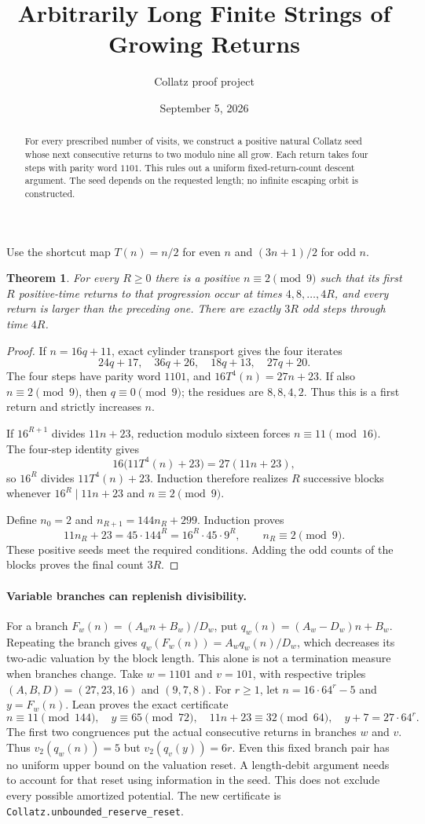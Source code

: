 \documentclass[10pt]{article}
\title{Arbitrarily Long Finite Strings of Growing Returns}
\author{Collatz proof project}
\date{September 5, 2026}
\newtheorem{theorem}{Theorem}
\begin{document}
\maketitle
\begin{abstract}
For every prescribed number of visits, we construct a positive natural
Collatz seed whose next consecutive returns to two modulo nine all grow.
Each return takes four steps with parity word $1101$. This rules out a
uniform fixed-return-count descent argument. The seed depends on the
requested length; no infinite escaping orbit is constructed.
\end{abstract}
Use the shortcut map $T(n)=n/2$ for even $n$ and $(3n+1)/2$ for odd $n$.
\begin{theorem}
For every $R\geq0$ there is a positive $n\equiv2\pmod9$ such that its
first $R$ positive-time returns to that progression occur at times
$4,8,\ldots,4R$, and every return is larger than the preceding one.
There are exactly $3R$ odd steps through time $4R$.
\end{theorem}
\begin{proof}
If $n=16q+11$, exact cylinder transport gives the four iterates
\[
24q+17,\quad36q+26,\quad18q+13,\quad27q+20.
\]
The four steps have parity word $1101$, and $16T^4(n)=27n+23$.
If also $n\equiv2\pmod9$, then $q\equiv0\pmod9$; the residues are
$8,8,4,2$. Thus this is a first return and strictly increases $n$.

If $16^{R+1}$ divides $11n+23$, reduction modulo sixteen forces
$n\equiv11\pmod{16}$. The four-step identity gives
\[
16\bigl(11T^4(n)+23\bigr)=27(11n+23),
\]
so $16^R$ divides $11T^4(n)+23$. Induction therefore realizes $R$
successive blocks whenever $16^R\mid11n+23$ and $n\equiv2\pmod9$.

Define $n_0=2$ and $n_{R+1}=144n_R+299$. Induction proves
\[
11n_R+23=45\cdot144^R=16^R\cdot45\cdot9^R,
\qquad n_R\equiv2\pmod9.
\]
These positive seeds meet the required conditions. Adding the odd counts
of the blocks proves the final count $3R$.
\end{proof}

\paragraph{Variable branches can replenish divisibility.}
For a branch $F_w(n)=(A_wn+B_w)/D_w$, put
$q_w(n)=(A_w-D_w)n+B_w$. Repeating the branch gives
$q_w(F_w(n))=A_wq_w(n)/D_w$, which decreases its two-adic valuation
by the block length. This alone is not a termination measure when branches
change. Take $w=1101$ and $v=101$, with respective triples
$(A,B,D)=(27,23,16)$ and $(9,7,8)$. For $r\geq1$, let
$n=16\cdot64^r-5$ and $y=F_w(n)$. Lean proves the exact certificate
\[
 n\equiv11\pmod{144},\quad y\equiv65\pmod{72},\quad
 11n+23\equiv32\pmod{64},\quad y+7=27\cdot64^r.
\]
The first two congruences put the actual consecutive returns in branches
$w$ and $v$. Thus $v_2(q_w(n))=5$ but $v_2(q_v(y))=6r$.
Even this fixed branch pair has no uniform upper bound on the valuation
reset. A length-debit argument needs to account for that reset using
information in the seed. This does not exclude every possible amortized
potential. The new certificate is
\texttt{Collatz.unbounded\_reserve\_reset}.
\end{document}
